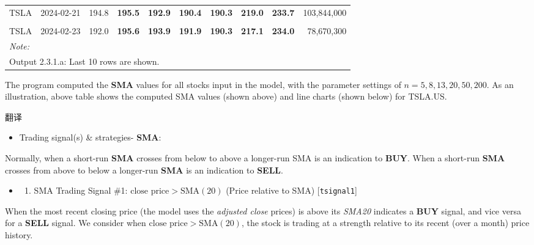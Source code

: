 \documentclass[
]{book}
\providecommand{\tightlist}{%
  \setlength{\itemsep}{0pt}\setlength{\parskip}{0pt}}
\begin{document}
\begin{table}[H]
{\begin{tabular}[t]{llr>{}r>{}r>{}r>{}r>{}r>{}rr}
TSLA & 2024-02-21 & 194.8 & \textbf{195.5} & \textbf{192.9} & \textbf{190.4} & \textbf{190.3} & \textbf{219.0} & \textbf{233.7} & 103,844,000\\
\cellcolor{gray!10}{TSLA} & \cellcolor{gray!10}{2024-02-22} & \cellcolor{gray!10}{197.4} & \textbf{\cellcolor{gray!10}{197.3}} & \textbf{\cellcolor{gray!10}{193.4}} & \textbf{\cellcolor{gray!10}{191.1}} & \textbf{\cellcolor{gray!10}{189.8}} & \textbf{\cellcolor{gray!10}{218.1}} & \textbf{\cellcolor{gray!10}{233.9}} & \cellcolor{gray!10}{92,739,500}\\
TSLA & 2024-02-23 & 192.0 & \textbf{195.6} & \textbf{193.9} & \textbf{191.9} & \textbf{190.3} & \textbf{217.1} & \textbf{234.0} & 78,670,300\\
\bottomrule
\multicolumn{10}{l}{\rule{0pt}{1em}\textit{Note: }}\\
\multicolumn{10}{l}{\rule{0pt}{1em}Output 2.3.1.a: Last 10 rows are shown.}\\
\end{tabular}}
\end{table}

The program computed the \textbf{SMA} values for all stocks input in the
model, with the parameter settings of \(n=5,8,13,20,50,200\). As an
illustration, above table shows the computed SMA values (shown above)
and line charts (shown below) for TSLA.US.

翻译

\begin{itemize}
\tightlist
\item
  Trading signal(s) \& strategies- \textbf{SMA}:
\end{itemize}

Normally, when a short-run \textbf{SMA} crosses from below to above a
longer-run SMA is an indication to \textbf{BUY}. When a short-run
\textbf{SMA} crosses from above to below a longer-run \textbf{SMA} is an
indication to \textbf{SELL}.

\begin{itemize}
\item
  \begin{enumerate}
  \def\labelenumi{\arabic{enumi}.}
  \tightlist
  \item
    SMA Trading Signal \#1: \(\text{close price}>\text{SMA}(20)\) (Price
    relative to SMA) {[}\texttt{tsignal1}{]}
  \end{enumerate}
\end{itemize}

When the most recent closing price (the model uses the \emph{adjusted
close} prices) is above its \emph{SMA20} indicates a \textbf{BUY}
signal, and vice versa for a \textbf{SELL} signal. We consider when
\(\text{close price}>\text{SMA}(20)\), the stock is trading at a
strength relative to its recent (over a month) price history.
\end{document}
